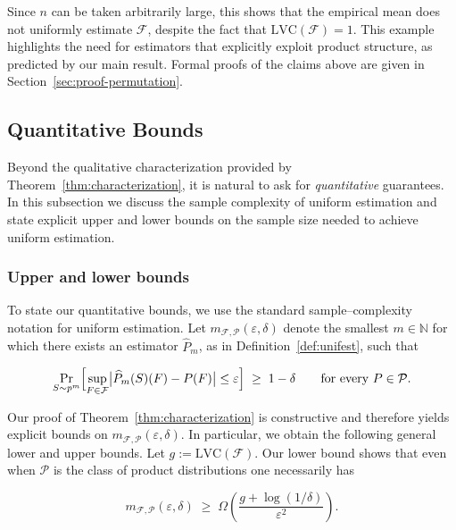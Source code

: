 \documentclass[arxiv]{colt2026}
\newcommand{\F}{\mathcal{F}}
\newcommand{\Pc}{\mathcal{P}}
\newcommand{\eps}{\varepsilon}
\newcommand{\LVC}{\mathrm{LVC}}
\begin{document}
Since $n$ can be taken arbitrarily large, this shows that the empirical mean does
not uniformly estimate $\F$, despite the fact that $\LVC(\F)=1$.
This example highlights the need for estimators that explicitly exploit product
structure, as predicted by our main result.
Formal proofs of the claims above are given in
Section~\ref{sec:proof-permutation}.

\vspace{-1em}
\subsection{Quantitative Bounds}
\label{subsec:quantitative-bounds}

\vspace{-0.3em}
Beyond the qualitative characterization provided by
Theorem~\ref{thm:characterization}, it is natural to ask for
\emph{quantitative} guarantees.
In this subsection we discuss the sample complexity of uniform estimation and
state explicit upper and lower bounds on the sample size needed to achieve uniform estimation.
\vspace{-1em}
\subsubsection{Upper and lower bounds}

\vspace{-0.3em}
To state our quantitative bounds, we use the standard sample--complexity
notation for uniform estimation.
Let $m_{\F,\Pc}(\eps,\delta)$ denote the smallest $m\in\mathbb N$ for which there
exists an estimator $\widehat P_{{m}}$, as in Definition~\ref{def:unifest}, such that

\vspace{-0.5em}
\[
\Pr_{{S\sim p^{m}}}\Bigl[\sup_{F\in\F}\bigl|\widehat P_{m}(S)(F)-P(F)\bigr|\le \eps\Bigr]
\;\ge\; 1-\delta
\qquad\text{for every }P\in\Pc .
\]

\vspace{-0.1em}
Our proof of Theorem~\ref{thm:characterization} is constructive and therefore
yields explicit bounds on $m_{\F,\Pc}(\eps,\delta)$.
In particular, we obtain the following general lower and upper bounds.
Let $g:=\LVC(\F)$.
Our lower bound shows that even when $\Pc$ is the class of product
distributions one necessarily has

\vspace{-0.3em}
\begin{equation}\label{eq:qb-lb}
m_{\F,\Pc}(\eps,\delta)
\;\ge\;
\Omega\!\left(\frac{g+\log(1/\delta)}{\eps^2}\right).
\end{equation}
\end{document}
